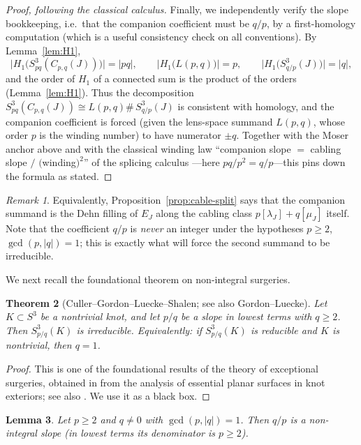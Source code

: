 \documentclass[11pt]{article}
\newtheorem{theorem}{Theorem}[section]
\newtheorem{lemma}[theorem]{Lemma}
\theoremstyle{definition}
\theoremstyle{remark}
\newtheorem{remark}[theorem]{Remark}
\numberwithin{equation}{section}
\begin{document}
\begin{proof}[Proof, following the classical calculus]
Finally, we independently verify the slope bookkeeping, i.e.\ that the
companion coefficient must be $q/p$, by a first-homology computation
(which is a useful consistency check on all conventions).  By
Lemma~\ref{lem:H1},
\[
\bigl|H_{1}\bigl(S^{3}_{pq}(C_{p,q}(J))\bigr)\bigr|=|pq|,\qquad
\bigl|H_{1}\bigl(L(p,q)\bigr)\bigr|=p,\qquad
\bigl|H_{1}\bigl(S^{3}_{q/p}(J)\bigr)\bigr|=|q|,
\]
and the order of $H_{1}$ of a connected sum is the product of the orders
(Lemma~\ref{lem:H1}).  Thus the decomposition
$S^{3}_{pq}(C_{p,q}(J))\cong L(p,q)\#\,S^{3}_{q/p}(J)$ is consistent with
homology, and the companion coefficient is forced (given the lens-space
summand $L(p,q)$, whose order $p$ is the winding number) to have
numerator $\pm q$.  Together with the Moser anchor above and with the
classical winding law ``companion slope $=$ cabling slope $/$
$($winding$)^{2}$'' of the splicing calculus \cite{EN85}---here
$pq/p^{2}=q/p$---this pins down the formula as stated.
\end{proof}

\begin{remark}
Equivalently, Proposition~\ref{prop:cable-split} says that the companion
summand is the Dehn filling of $E_{J}$ along the cabling class
$p[\lambda_{J}]+q[\mu_{J}]$ itself.  Note that the coefficient $q/p$ is
\emph{never} an integer under the hypotheses $p\ge 2$,
$\gcd(p,|q|)=1$; this is exactly what will force the second summand to
be irreducible.
\end{remark}

We next recall the foundational theorem on non-integral surgeries.

\begin{theorem}[Culler--Gordon--Luecke--Shalen; see also
Gordon--Luecke]\label{thm:nonintegral}
Let $K\subset S^{3}$ be a nontrivial knot, and let $p/q$ be a slope in
lowest terms with $q\ge 2$.  Then $S^{3}_{p/q}(K)$ is irreducible.
Equivalently: if $S^{3}_{p/q}(K)$ is reducible and $K$ is nontrivial,
then $q=1$.
\end{theorem}

\begin{proof}
This is one of the foundational results of the theory of exceptional
surgeries, obtained in \cite{CGLS} from the analysis of essential planar
surfaces in knot exteriors; see also \cite{GL89}.  We use it as a black
box.
\end{proof}

\begin{lemma}\label{lem:q-over-p}
Let $p\ge2$ and $q\neq0$ with $\gcd(p,|q|)=1$.  Then $q/p$ is a
non-integral slope (in lowest terms its denominator is $p\ge2$).
\end{lemma}
\end{document}
